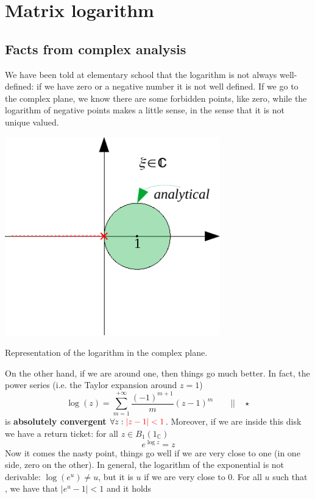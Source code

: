 \documentclass[../main.tex]{subfiles}
\begin{document}
\section{Matrix logarithm}
\subsection{Facts from complex analysis}
We have been told at elementary school that the logarithm is not always well-defined: if we have zero or a negative number it is not well defined.
If we go to the complex plane, we know there are some forbidden points, like zero, while the logarithm of negative points makes a little sense, in the sense that it is not unique valued. 
\begin{marginfigure}
    \centering
    \includegraphics[width=0.7\textwidth]{images/analytical.pdf}
    \caption{Representation of the logarithm in the complex plane.}
\end{marginfigure}
On the other hand, if we are around one, then things go much better. In fact, the power series (i.e. the Taylor expansion around $z=1$)
\[
\log(z)=\sum_{m=1}^{+\infty}\frac{(-1)^{m+1}}{m}(z-1)^m \qquad \Big|\Big| \quad \star
\]
is \textbf{absolutely convergent} $\forall z:{\color{red}|z-1|<1}$. Moreover, if we are inside this disk we have a return ticket: for all $z\in B_1(1_{\mathbb{C}})$
\[
e^{\log z}=z
\]
Now it comes the nasty point, things go well if we are very close to one (in one side, zero on the other). In general, the logarithm of the exponential is not derivable: $\log(e^u)\neq u$, but it is $u$ if we are very close to $0$. For all $u$ such that {\color{red}}, we have that $|e^u-1|<1$ and it holds
\end{document}

